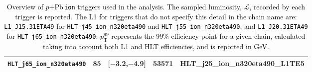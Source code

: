 \documentclass[NOTE, atlasdraft=true, texlive=2020, UKenglish]{atlasdoc}
\newcommand{\PTE}{p_{\text{T}}}
\newcommand{\pxPb}{$p$+Pb}
\begin{document}
\begin{table}[!ht]
\begin{tabular}{ | c | c | c | c | c |}
            \hline
            \multicolumn{1}{|l|}{\texttt{HLT\_j65\_ion\_n320eta490}}   & 85  & [$-$3.2,$-$4.9]   & 53571 &  \multicolumn{1}{l|}{\tiny HLT\_j25\_ion\_n320eta490\_L1TE5}\\
            \hline
        \end{tabular}
        \vspace{2mm}
        \caption{
        \textcolor{black}{
        Overview of \pxPb\,\texttt{ion} triggers used in the analysis. The sampled luminosity, $\mathscr{L}$, recorded by each trigger is reported. The L1 for triggers that do not specify this detail in the chain name are:  \texttt{L1\_J15.31ETA49} for \texttt{HLT\_j45\_ion\_n320eta490} and \texttt{HLT\_j55\_ion\_n320eta490}, and \texttt{L1\_J20.31ETA49} for \texttt{HLT\_j65\_ion\_n320eta490}. $\PTE^{99}$ represents the 99\% efficiency point for a given chain, calculated taking into account both L1 and HLT efficiencies, and is reported in GeV.
        }
        }
        \label{tab:trigger_overview_pPb}
\end{table}
\end{document}
